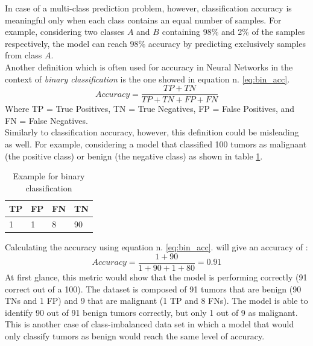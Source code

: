 In case of a multi-class prediction problem, however, classification accuracy is meaningful only when each class contains an equal number of samples. For example, considering two classes $A$ and $B$ containing 98\% and 2\% of the samples respectively, the model can reach 98\% accuracy by predicting exclusively samples from class $A$. \\
Another definition which is often used for accuracy in Neural Networks in the context of \textit{binary classification} is the one showed in equation n. \ref{eq:bin_acc}.
 \begin{equation}
Accuracy = \dfrac{TP+TN}{TP+TN+FP+FN}
\label{eq:bin_acc}    
\end{equation}
Where TP = True Positives, TN = True Negatives, FP = False Positives, and FN = False Negatives.\\
Similarly to classification accuracy, however, this definition could be misleading as well.  For example, considering a model that classified 100 tumors as malignant (the positive class) or benign (the negative class) as shown in table \ref{tab:tumor}. 

\begin{table}[h]
\centering
\begin{tabular}{ p{1cm} p{2cm} p{2cm} p{2cm}}
 TP&FP&FN&TN\\
 \hline
    1 & 1& 8& 90\\
\end{tabular}
\caption{Example for binary classification}
\label{tab:tumor}
\end{table}
Calculating the accuracy using equation n. \ref{eq:bin_acc}. will give an accuracy of :
 \begin{equation}
Accuracy = \dfrac{1+90}{1+90+1+80} = 0.91
\label{eq:bin_acc2}    
  \end{equation}
At first glance, this metric would show that the model is performing correctly (91 correct out of a 100). The dataset is composed of 91 tumors that are benign (90 TNs and 1 FP) and 9 that are malignant (1 TP and 8 FNs). The model is able to identify 90 out of 91 benign tumors correctly, but only 1 out of 9 as malignant. This is another case of class-imbalanced data set in which a model that would only classify tumors as benign would reach the same level of accuracy. \cite{google_doc}\\



